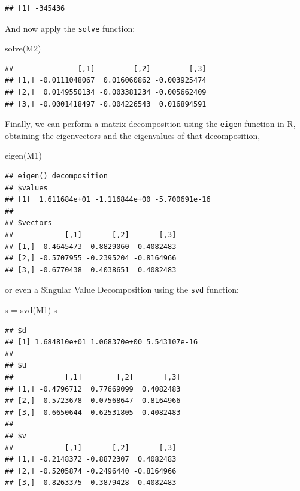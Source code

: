 \documentclass[
]{book}
\newenvironment{Shaded}{\begin{snugshade}}{\end{snugshade}}
\newcommand{\FunctionTok}[1]{\textcolor[rgb]{0.00,0.00,0.00}{#1}}
\newcommand{\NormalTok}[1]{#1}
\newcommand{\OtherTok}[1]{\textcolor[rgb]{0.56,0.35,0.01}{#1}}
\theoremstyle{definition}
\theoremstyle{definition}
\theoremstyle{definition}
\theoremstyle{definition}
\theoremstyle{remark}
\begin{document}
\begin{verbatim}
## [1] -345436
\end{verbatim}

And now apply the \texttt{solve} function:

\begin{Shaded}
\begin{Highlighting}[]
\FunctionTok{solve}\NormalTok{(M2)}
\end{Highlighting}
\end{Shaded}

\begin{verbatim}
##               [,1]         [,2]         [,3]
## [1,] -0.0111048067  0.016060862 -0.003925474
## [2,]  0.0149550134 -0.003381234 -0.005662409
## [3,] -0.0001418497 -0.004226543  0.016894591
\end{verbatim}

Finally, we can perform a matrix decomposition using the \texttt{eigen} function in R, obtaining the eigenvectors and the eigenvalues of that decomposition,

\begin{Shaded}
\begin{Highlighting}[]
\FunctionTok{eigen}\NormalTok{(M1)}
\end{Highlighting}
\end{Shaded}

\begin{verbatim}
## eigen() decomposition
## $values
## [1]  1.611684e+01 -1.116844e+00 -5.700691e-16
## 
## $vectors
##            [,1]       [,2]       [,3]
## [1,] -0.4645473 -0.8829060  0.4082483
## [2,] -0.5707955 -0.2395204 -0.8164966
## [3,] -0.6770438  0.4038651  0.4082483
\end{verbatim}

or even a Singular Value Decomposition using the \texttt{svd} function:

\begin{Shaded}
\begin{Highlighting}[]
\NormalTok{s }\OtherTok{=} \FunctionTok{svd}\NormalTok{(M1)}
\NormalTok{s}
\end{Highlighting}
\end{Shaded}

\begin{verbatim}
## $d
## [1] 1.684810e+01 1.068370e+00 5.543107e-16
## 
## $u
##            [,1]        [,2]       [,3]
## [1,] -0.4796712  0.77669099  0.4082483
## [2,] -0.5723678  0.07568647 -0.8164966
## [3,] -0.6650644 -0.62531805  0.4082483
## 
## $v
##            [,1]       [,2]       [,3]
## [1,] -0.2148372 -0.8872307  0.4082483
## [2,] -0.5205874 -0.2496440 -0.8164966
## [3,] -0.8263375  0.3879428  0.4082483
\end{verbatim}
\end{document}
